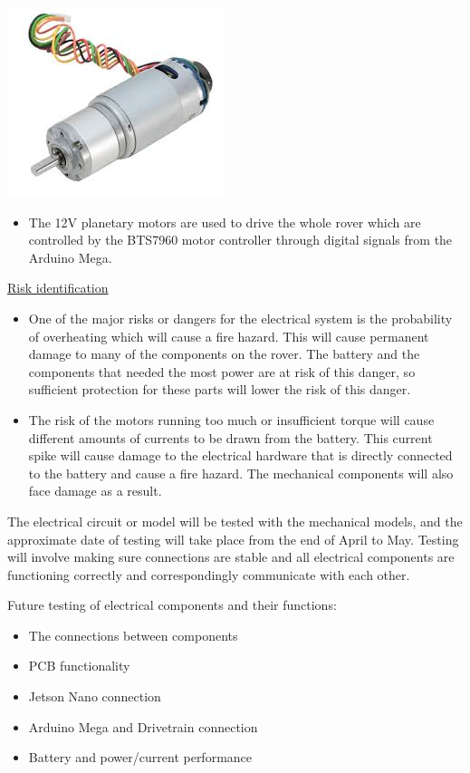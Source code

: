 \documentclass[a4paper, 10pt]{article}
\begin{document}
\includegraphics[scale=0.5]{Photos/Gear motor 12V planetary}

\begin{itemize}
\item
	The 12V planetary motors are used to drive the whole rover which are controlled by the BTS7960 motor controller through digital signals from the Arduino Mega.
\end{itemize}

\underline{Risk identification}

\begin{itemize}
\item
	One of the major risks or dangers for the electrical system is the probability of overheating which will cause a fire hazard. This will cause permanent damage to many of the components on the rover. The battery and the components that needed the most power are at risk of this danger, so sufficient protection for these parts will lower the risk of this danger.

\item
	The risk of the motors running too much or insufficient torque will cause different amounts of currents to be drawn from the battery. This current spike will cause damage to the electrical hardware that is directly connected to the battery and cause a fire hazard. The mechanical components will also face damage as a result.
\end{itemize}

The electrical circuit or model will be tested with the mechanical models, and the approximate date of testing will take place from the end of April to May. Testing will involve making sure connections are stable and all electrical components are functioning correctly and correspondingly communicate with each other. 
		
Future testing of electrical components and their functions:
\begin{itemize}
\item
The connections between components

\item
PCB functionality

\item
Jetson Nano connection

\item
Arduino Mega and Drivetrain connection

\item
Battery and power/current performance
\end{itemize}
\end{document}
